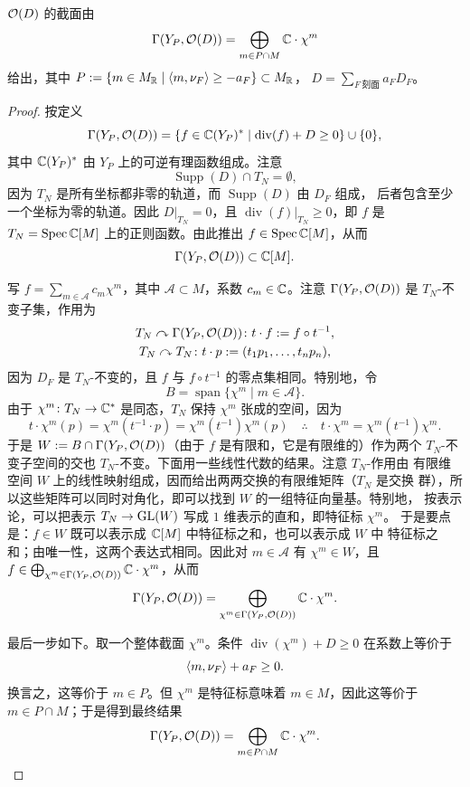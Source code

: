 \begin{claim}[{$\OO(D)$ 的截面，[CLS11][Proposition 4.3.3]}]\label{claim:sections}
$\OO(D)$ 的截面由
\[
\Gamma(Y_P,\mathcal{O}(D)) = \bigoplus_{m\in P\cap M}\mathbb{C}\cdot\chi^m
\]
给出，其中 $P := \{m\in M_{\mathbb{R}}\mid \langle m,\nu_F\rangle\ge -a_F\}\subset M_{\mathbb{R}}$，
$D = \sum_{F\ \text{刻面}} a_F D_F$。
\end{claim}


\begin{proof}
按定义
\[
\Gamma(Y_P,\mathcal{O}(D)) = \{f\in\mathbb{C}(Y_P)^*\mid
\operatorname{div}(f)+D\ge 0\}\cup\{0\},
\]
其中 $\mathbb{C}(Y_P)^*$ 由 $Y_P$ 上的可逆有理函数组成。注意
\[
\operatorname{Supp}(D)\cap T_N = \emptyset,
\]
因为 $T_N$ 是所有坐标都非零的轨道，而 $\operatorname{Supp}(D)$ 由 $D_F$ 组成，
后者包含至少一个坐标为零的轨道。因此 $D|_{T_N} = 0$，且
$\operatorname{div}(f)|_{T_N}\ge 0$，即 $f$ 是 $T_N = \operatorname{Spec}\mathbb{C}[M]$
上的正则函数。由此推出 $f\in\operatorname{Spec}\mathbb{C}[M]$，从而
\[
\Gamma(Y_P,\mathcal{O}(D))\subset \mathbb{C}[M].
\]

写 $f = \sum_{m\in\mathcal A} c_m\chi^m$，其中 $\mathcal A\subset M$，系数
$c_m\in\mathbb{C}$。注意 $\Gamma(Y_P,\mathcal{O}(D))$ 是 $T_N$-不变子集，作用为
\begin{gather*}
T_N\curvearrowright\Gamma(Y_P,\mathcal{O}(D))\colon t\cdot f := f\circ t^{-1},\\
T_N\curvearrowright T_N\colon t\cdot p := (t_1p_1,\dots,t_np_n),
\end{gather*}
因为 $D_F$ 是 $T_N$-不变的，且 $f$ 与 $f\circ t^{-1}$ 的零点集相同。特别地，令
\[
B = \operatorname{span}\{\chi^m\mid m\in\mathcal A\}.
\]
由于 $\chi^m\colon T_N\to\mathbb{C}^*$ 是同态，$T_N$ 保持 $\chi^m$ 张成的空间，因为
\[
t\cdot\chi^m(p) = \chi^m(t^{-1}\cdot p) = \chi^m(t^{-1})\chi^m(p)
\quad\therefore\quad t\cdot\chi^m = \chi^m(t^{-1})\chi^m.
\]
于是 $W := B\cap\Gamma(Y_P,\mathcal{O}(D))$（由于 $f$ 是有限和，它是有限维的）作为两个
$T_N$-不变子空间的交也 $T_N$-不变。下面用一些线性代数的结果。注意 $T_N$-作用由
有限维空间 $W$ 上的线性映射组成，因而给出两两交换的有限维矩阵（$T_N$ 是交换
群），所以这些矩阵可以同时对角化，即可以找到 $W$ 的一组特征向量基。特别地，
按表示论，可以把表示 $T_N\to\operatorname{GL}(W)$ 写成 $1$ 维表示的直和，即特征标 $\chi^m$。
于是要点是：$f\in W$ 既可以表示成 $\mathbb{C}[M]$ 中特征标之和，也可以表示成 $W$ 中
特征标之和；由唯一性，这两个表达式相同。因此对 $m\in\mathcal A$ 有
$\chi^m\in W$，且
$f\in\bigoplus_{\chi^m\in\Gamma(Y_P,\mathcal{O}(D))}\mathbb{C}\cdot\chi^m$，从而
\[
\Gamma(Y_P,\mathcal{O}(D)) = \bigoplus_{\chi^m\in\Gamma(Y_P,\mathcal{O}(D))}\mathbb{C}\cdot\chi^m.
\]

最后一步如下。取一个整体截面 $\chi^m$。条件
$\operatorname{div}(\chi^m)+D\ge 0$ 在系数上等价于
\[
\langle m,\nu_F\rangle+a_F\ge 0.
\]
换言之，这等价于 $m\in P$。但 $\chi^m$ 是特征标意味着 $m\in M$，因此这等价于
$m\in P\cap M$；于是得到最终结果
\[
\Gamma(Y_P,\mathcal{O}(D)) = \bigoplus_{m\in P\cap M}\mathbb{C}\cdot\chi^m.
\]
\end{proof}

